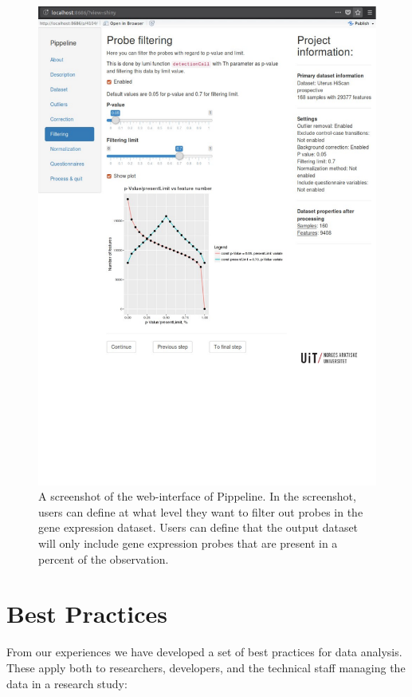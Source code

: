 \begin{figure}
    \includegraphics[width=\linewidth]{figures/scr_filtering.pdf}
    \caption[A screenshot of the web-interface of Pippeline.]{A screenshot of
    the web-interface of Pippeline. In the screenshot, users can define at what
    level they want to filter out probes in the gene expression dataset. Users
    can define that the output dataset will only include gene expression probes
    that are present in a percent of the observation.}
  \label{fig:scr_filtering}
\end{figure}

\section{Best Practices} 
From our experiences we have developed a set of best practices for data
analysis. These apply both to researchers, developers, and the technical
staff managing the data in a research study: 

